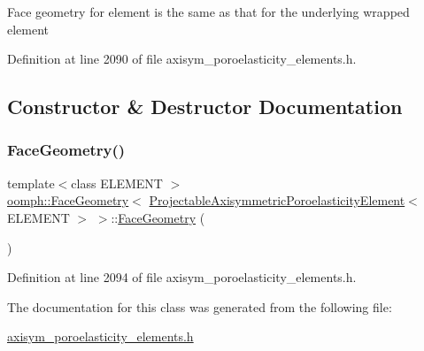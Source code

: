 Face geometry for element is the same as that for the underlying wrapped element 

Definition at line 2090 of file axisym\+\_\+poroelasticity\+\_\+elements.\+h.



\subsection{Constructor \& Destructor Documentation}
\mbox{\label{classoomph_1_1FaceGeometry_3_01ProjectableAxisymmetricPoroelasticityElement_3_01ELEMENT_01_4_01_4_a85d44a257746442a32b1cfbe1cf27f21}} 
\subsubsection{\texorpdfstring{Face\+Geometry()}{FaceGeometry()}}
{\footnotesize\ttfamily template$<$class E\+L\+E\+M\+E\+NT $>$ \\
\hyperlink{classoomph_1_1FaceGeometry}{oomph\+::\+Face\+Geometry}$<$ \hyperlink{classoomph_1_1ProjectableAxisymmetricPoroelasticityElement}{Projectable\+Axisymmetric\+Poroelasticity\+Element}$<$ E\+L\+E\+M\+E\+NT $>$ $>$\+::\hyperlink{classoomph_1_1FaceGeometry}{Face\+Geometry} (\begin{DoxyParamCaption}{ }\end{DoxyParamCaption})\hspace{0.3cm}{\ttfamily [inline]}}



Definition at line 2094 of file axisym\+\_\+poroelasticity\+\_\+elements.\+h.



The documentation for this class was generated from the following file\+:\begin{DoxyCompactItemize}
\item 
\hyperlink{axisym__poroelasticity__elements_8h}{axisym\+\_\+poroelasticity\+\_\+elements.\+h}\end{DoxyCompactItemize}
